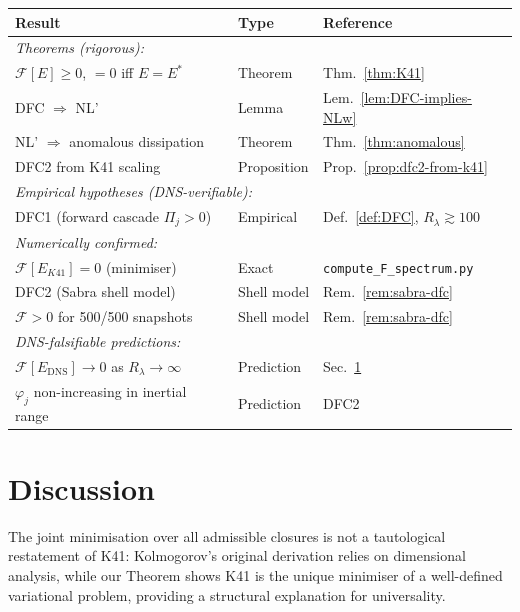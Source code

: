 \documentclass[12pt,a4paper]{article}
\theoremstyle{definition}
\theoremstyle{plain}
\theoremstyle{remark}
\begin{document}
\begin{center}
\begin{tabular}{|l|l|l|}
\hline
\textbf{Result} & \textbf{Type} & \textbf{Reference} \\
\hline
\hline
\multicolumn{3}{|l|}{\textit{Theorems (rigorous):}} \\
\hline
$\mathcal{F}[E] \geq 0$, $= 0$ iff $E = E^*$ & Theorem & Thm.~\ref{thm:K41} \\
DFC $\Rightarrow$ NL' & Lemma & Lem.~\ref{lem:DFC-implies-NLw} \\
NL' $\Rightarrow$ anomalous dissipation & Theorem & Thm.~\ref{thm:anomalous} \\
DFC2 from K41 scaling & Proposition & Prop.~\ref{prop:dfc2-from-k41} \\
\hline
\multicolumn{3}{|l|}{\textit{Empirical hypotheses (DNS-verifiable):}} \\
\hline
DFC1 (forward cascade $\Pi_j > 0$) & Empirical & Def.~\ref{def:DFC}, $R_\lambda \gtrsim 100$ \\
\hline
\multicolumn{3}{|l|}{\textit{Numerically confirmed:}} \\
\hline
$\mathcal{F}[E_{K41}] = 0$ (minimiser) & Exact & \texttt{compute\_F\_spectrum.py} \\
DFC2 (Sabra shell model) & Shell model & Rem.~\ref{rem:sabra-dfc} \\
$\mathcal{F} > 0$ for 500/500 snapshots & Shell model & Rem.~\ref{rem:sabra-dfc} \\
\hline
\multicolumn{3}{|l|}{\textit{DNS-falsifiable predictions:}} \\
\hline
$\mathcal{F}[E_{\mathrm{DNS}}] \to 0$ as $R_\lambda \to \infty$ & Prediction & Sec.~\ref{sec:discussion} \\
$\varphi_j$ non-increasing in inertial range & Prediction & DFC2 \\
\hline
\end{tabular}
\end{center}

\section{Discussion}\label{sec:discussion}

The joint minimisation over all admissible closures is not a tautological restatement of K41: Kolmogorov's original derivation relies on dimensional analysis, while our Theorem shows K41 is the unique minimiser of a well-defined variational problem, providing a structural explanation for universality.
\end{document}
